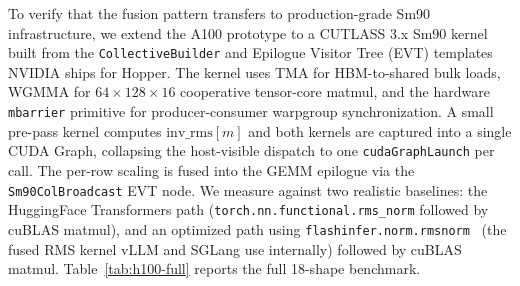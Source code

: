 \documentclass{article}
\begin{document}
To verify that the fusion pattern transfers to production-grade Sm90 infrastructure, we extend the A100 prototype to a CUTLASS 3.x Sm90 kernel built from the \texttt{CollectiveBuilder} and Epilogue Visitor Tree (EVT) templates NVIDIA ships for Hopper. The kernel uses TMA for HBM-to-shared bulk loads, WGMMA for $64{\times}128{\times}16$ cooperative tensor-core matmul, and the hardware \texttt{mbarrier} primitive for producer-consumer warpgroup synchronization. A small pre-pass kernel computes $\mathrm{inv\_rms}[m]$ and both kernels are captured into a single CUDA Graph, collapsing the host-visible dispatch to one \texttt{cudaGraphLaunch} per call. The per-row scaling is fused into the GEMM epilogue via the \texttt{Sm90ColBroadcast} EVT node. We measure against two realistic baselines: the HuggingFace Transformers path (\texttt{torch.nn.functional.rms\_norm} followed by cuBLAS matmul), and an optimized path using \texttt{flashinfer.norm.rmsnorm}~\citep{flashInfer} (the fused RMS kernel vLLM and SGLang use internally) followed by cuBLAS matmul. Table~\ref{tab:h100-full} reports the full 18-shape benchmark.
\end{document}
